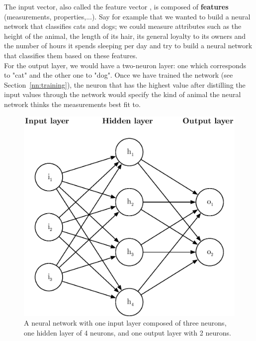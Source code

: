 The input vector, also called the feature vector ,
is composed of \textbf{features} (measurements, properties,...). Say
for example that we wanted to build a neural network that classifies cats and
dogs; we could measure attributes such as the height of the animal, the length
of its hair, its general loyalty to its owners and the number of hours it 
spends sleeping per day and try to build a neural network that classifies
them based on these features.\\

For the output layer, we would have a two-neuron layer: one which corresponds
to "cat" and the other one to "dog". Once we have trained the network
(see Section~\ref{nn:training}), the neuron that has the highest value
after distilling the input values through the network would specify the
kind of animal the neural network thinks the measurements best fit to.\\

\begin{figure}[]
	\centering
	\includegraphics[width=0.6\linewidth]{fig/neural_network.eps}
	\caption{A neural network with one input layer composed of three neurons,
	one hidden layer of 4 neurons, and one output layer with 2 neurons.}
	\label{fig:neural_network}
\end{figure}


